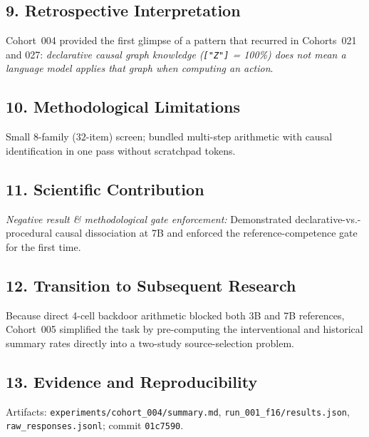 \subsection*{9. Retrospective Interpretation}
Cohort~004 provided the first glimpse of a pattern that recurred in Cohorts~021 and 027: \emph{declarative causal graph knowledge (\texttt{["Z"]} = 100\%) does not mean a language model applies that graph when computing an action}.

\subsection*{10. Methodological Limitations}
Small $8$-family ($32$-item) screen; bundled multi-step arithmetic with causal identification in one pass without scratchpad tokens.

\subsection*{11. Scientific Contribution}
\emph{Negative result \& methodological gate enforcement:} Demonstrated declarative-vs.-procedural causal dissociation at 7B and enforced the reference-competence gate for the first time.

\subsection*{12. Transition to Subsequent Research}
Because direct 4-cell backdoor arithmetic blocked both 3B and 7B references, Cohort~005 simplified the task by pre-computing the interventional and historical summary rates directly into a two-study source-selection problem.

\subsection*{13. Evidence and Reproducibility}
Artifacts: \texttt{experiments/cohort\_004/summary.md}, \texttt{run\_001\_f16/results.json}, \texttt{raw\_responses.jsonl}; commit \texttt{01c7590}.
